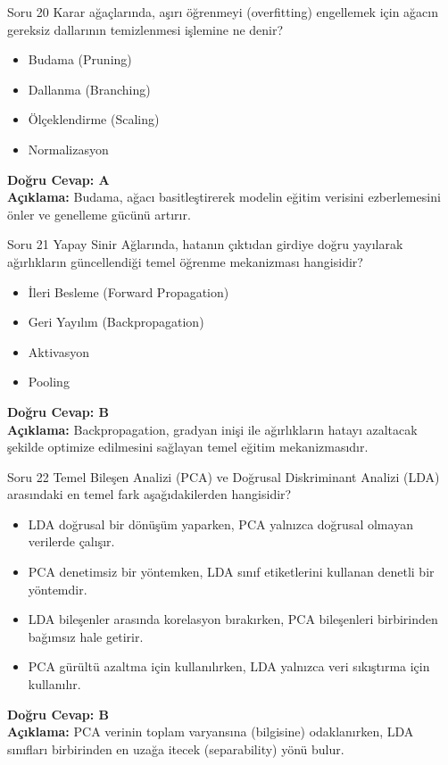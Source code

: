 \documentclass[12pt,a4paper]{article}
\begin{document}
\begin{testcard}{Soru 20}
    Karar ağaçlarında, aşırı öğrenmeyi (overfitting) engellemek için ağacın gereksiz dallarının temizlenmesi işlemine ne denir?
    \begin{itemize}
        \item[A)] Budama (Pruning)
        \item[B)] Dallanma (Branching)
        \item[C)] Ölçeklendirme (Scaling)
        \item[D)] Normalizasyon
    \end{itemize}
    \tcblower
    \textbf{Doğru Cevap: A} \\
    \textbf{Açıklama:} Budama, ağacı basitleştirerek modelin eğitim verisini ezberlemesini önler ve genelleme gücünü artırır.
\end{testcard}

\begin{testcard}{Soru 21}
    Yapay Sinir Ağlarında, hatanın çıktıdan girdiye doğru yayılarak ağırlıkların güncellendiği temel öğrenme mekanizması hangisidir?
    \begin{itemize}
        \item[A)] İleri Besleme (Forward Propagation)
        \item[B)] Geri Yayılım (Backpropagation)
        \item[C)] Aktivasyon
        \item[D)] Pooling
    \end{itemize}
    \tcblower
    \textbf{Doğru Cevap: B} \\
    \textbf{Açıklama:} Backpropagation, gradyan inişi ile ağırlıkların hatayı azaltacak şekilde optimize edilmesini sağlayan temel eğitim mekanizmasıdır.
\end{testcard}

\begin{testcard}{Soru 22}
    Temel Bileşen Analizi (PCA) ve Doğrusal Diskriminant Analizi (LDA) arasındaki en temel fark aşağıdakilerden hangisidir?
    \begin{itemize}
        \item[A)] LDA doğrusal bir dönüşüm yaparken, PCA yalnızca doğrusal olmayan verilerde çalışır.
        \item[B)] PCA denetimsiz bir yöntemken, LDA sınıf etiketlerini kullanan denetli bir yöntemdir.
        \item[C)] LDA bileşenler arasında korelasyon bırakırken, PCA bileşenleri birbirinden bağımsız hale getirir.
        \item[D)] PCA gürültü azaltma için kullanılırken, LDA yalnızca veri sıkıştırma için kullanılır.
    \end{itemize}
    \tcblower
    \textbf{Doğru Cevap: B} \\
    \textbf{Açıklama:} PCA verinin toplam varyansına (bilgisine) odaklanırken, LDA sınıfları birbirinden en uzağa itecek (separability) yönü bulur.
\end{testcard}
\end{document}
